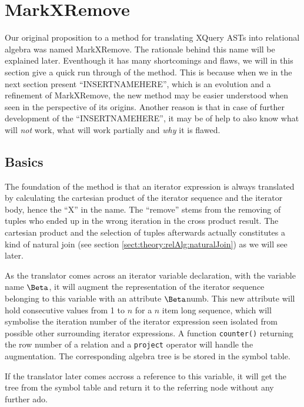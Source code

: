 \section{MarkXRemove}
\label{sect:translation:MarkXRemove}

Our original proposition to a method for translating XQuery ASTs into relational algebra was named MarkXRemove.
The rationale behind this name will be explained later. Eventhough it has many shortcomings and flaws, we
will in this section give a quick run through of the method. This is because when we in the next section present
``INSERTNAMEHERE'', which is an evolution and a refinement of MarkXRemove, the new method may be easier understood
when seen in the perspective of its origins. Another reason is that in case of further development of the
``INSERTNAMEHERE'', it may be of help to also know what will \textit{not} work, what will work partially and
\textit{why} it is flawed.

\subsection{Basics}
\label{sect:translation:mxr:basics}

The foundation of the method is that an iterator expression is always translated by calculating the cartesian
product of the iterator sequence and the iterator body, hence the ``X'' in the name. The ``remove'' stems from the
removing of tuples who ended up in the wrong iteration in the cross product result. The cartesian product and the
selection of tuples afterwards actually constitutes a kind of natural join (see section
\ref{sect:theory:relAlg:naturalJoin}) as we will see later.

As the translator comes across an iterator variable declaration, with the variable name $\Beta$, it will augment
the representation of the iterator sequence belonging to this variable with an attribute $\Beta$\textsf{numb}.
This new attribute will hold consecutive values from 1 to $n$ for a $n$ item long sequence, which will symbolise the
iteration number of the iterator expression seen isolated from possible other surrounding iterator expressions. A
function \texttt{counter()} returning the row number of a relation and a \texttt{project} operator will handle
the augmentation. The corresponding algebra tree is be stored in the symbol table.

If the translator later comes accross a reference to this variable, it will get the tree from the symbol table and
return it to the referring node without any further ado.
